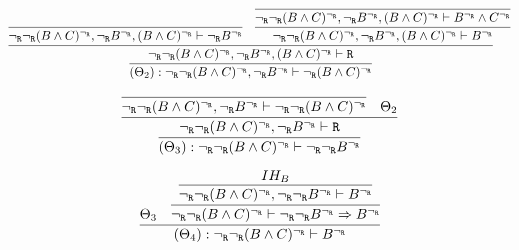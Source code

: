 \begin{enumerate}[(i)]
\begin{itemize}
            $$
            \infer{
                            (\Theta_2) : \ngr\ngr(B \wedge C)^\ngr, \ngr B^\ngr \vdash \ngr(B \wedge C)^\ngr
                        }{
                            \infer{
                                \ngr\ngr(B \wedge C)^\ngr, \ngr B^\ngr, (B \wedge C)^\ngr \vdash \R
                            }{
                                \infer{
                                    \ngr\ngr(B \wedge C)^\ngr, \ngr B^\ngr, (B \wedge C)^\ngr \vdash \ngr B^\ngr
                                }{
                                }&
                                \infer{
                                    \ngr\ngr(B \wedge C)^\ngr, \ngr B^\ngr, (B \wedge C)^\ngr \vdash B^\ngr
                                }{
                                    \infer{
                                        \ngr\ngr(B \wedge C)^\ngr, \ngr B^\ngr, (B \wedge C)^\ngr \vdash B^\ngr \wedge C^\ngr
                                    }{
                                    }
                                }
                            }
                        }
            $$        
        
            $$
            \infer{
                    (\Theta_3) : \ngr\ngr(B \wedge C)^\ngr \vdash \ngr\ngr B^\ngr
                }{
                    \infer{
                        \ngr\ngr(B \wedge C)^\ngr, \ngr B^\ngr \vdash \R
                    }{
                        \infer{
                            \ngr\ngr(B \wedge C)^\ngr, \ngr B^\ngr \vdash \ngr\ngr(B \wedge C)^\ngr
                        }{
                        }&
                        \Theta_2
                    }
                }
            $$        
        
            $$
            \infer{
                (\Theta_4) : \ngr\ngr(B \wedge C)^\ngr \vdash B^\ngr
            }{
                \Theta_3
                &
                \infer{
                    \ngr\ngr(B \wedge C)^\ngr \vdash \ngr\ngr B^\ngr \Rightarrow  B^\ngr
                }{
                    \infer{
                        \ngr\ngr(B \wedge C)^\ngr, \ngr\ngr B^\ngr \vdash  B^\ngr
                    }{
                        IH_B
                    }
                }
            }
            $$
            

\end{itemize}
\end{enumerate}
